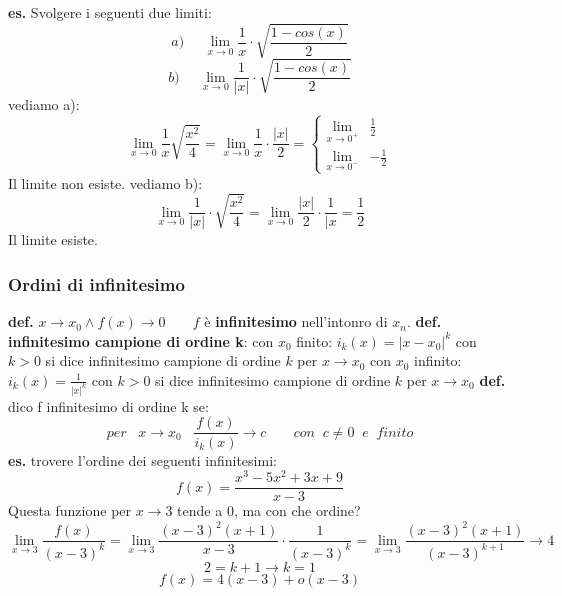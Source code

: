 \textbf{es.} Svolgere i seguenti due limiti:
\[
    a) \;\;\;\;\;\lim_{x\rightarrow 0} \frac{1}{x} \cdot \sqrt{\frac{1-cos(x)}{2}}
\]
\[
    b) \;\;\;\;\;\lim_{x\rightarrow 0} \frac{1}{|x|} \cdot \sqrt{\frac{1-cos(x)}{2}}
\]
vediamo a):
\[
    \lim_{x\rightarrow 0} \frac{1}{x}\sqrt{\frac{x^2}{4}} = \lim_{x\rightarrow 0} \frac{1}{x} \cdot \frac{|x|}{2}= \begin{cases}
        \lim_{x\rightarrow 0^+} &\frac{1}{2} \\
        \lim_{x\rightarrow 0^-} &-\frac{1}{2}
    \end{cases}
\]
Il limite non esiste.
\newline
vediamo b):
\[
    \lim_{x\rightarrow 0} \frac{1}{|x|} \cdot \sqrt{\frac{x^2}{4}} = \lim_{x\rightarrow 0} \frac{|x|}{2} \cdot \frac{1}{|x} = \frac{1}{2}
\]
Il limite esiste.
\newline
\newline
\newline
\subsubsection*{Ordini di infinitesimo}
\textbf{def.} $x \rightarrow x_0 \land f(x) \rightarrow 0 \;\;\;\;\;\;\; f$ è \textbf{infinitesimo} nell'intonro di $x_n$.
\newline
\newline
\textbf{def.} \textbf{infinitesimo campione di ordine k}:
\newline
con $x_0$ finito: $i_k(x) = |x-x_0|^k$ con $k>0$ si dice infinitesimo campione di ordine $k$ per $x \rightarrow x_0$
\newline
con $x_0$ infinito: $i_k(x) = \frac{1}{|x|^k}$ con $k>0$ si dice infinitesimo campione di ordine $k$ per $x \rightarrow x_0$
\newline
\newline
\textbf{def.} dico f infinitesimo di ordine k se:
\[
    per \;\;\; x \rightarrow x_0 \;\;\; \frac{f(x)}{i_k(x)} \longrightarrow c \;\;\;\;\;\;\; con \;\; c \neq 0\;\; e \;\;finito
\]
\newline
\newline
\newline
\textbf{es.} trovere l'ordine dei seguenti infinitesimi:
\[
    f(x) = \frac{x^3 - 5x^2 + 3x +9}{x-3}
\]
Questa funzione per $x \rightarrow  3$ tende a $0$, ma con che ordine?
\[
    \lim_{x\rightarrow 3} \frac{f(x)}{(x-3)^k} = \lim_{x\rightarrow 3} \frac{(x-3)^2(x+1)}{x-3} \cdot  \frac{1}{(x-3)^k} = \lim_{x\rightarrow 3} \frac{(x-3)^2(x+1)}{(x-3)^{k+1}} \rightarrow  4
\]
\[
    2 = k+1 \rightarrow  k= 1
\]
\[
    f(x) = 4(x-3) + o (x-3)
\]
\newline
\newline
\newline
